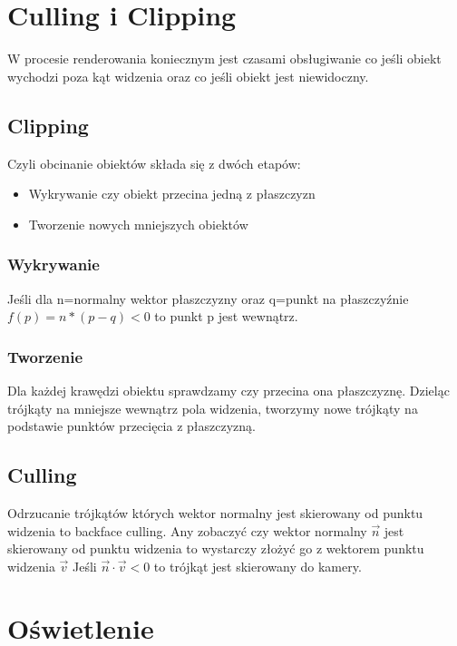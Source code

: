\documentclass{../notatki}
\begin{document}
\section{Culling i Clipping}

W procesie renderowania koniecznym jest czasami obsługiwanie co jeśli obiekt wychodzi poza kąt widzenia oraz co jeśli obiekt jest niewidoczny.

\subsection{Clipping}

Czyli obcinanie obiektów składa się z dwóch etapów:

\begin{itemize}
    \item Wykrywanie czy obiekt przecina jedną z płaszczyzn
    \item Tworzenie nowych mniejszych obiektów
\end{itemize}

\subsubsection{Wykrywanie}

Jeśli dla n=normalny wektor płaszczyzny oraz q=punkt na płaszczyźnie $f(p) = n * (p - q) < 0$ to punkt p jest wewnątrz.

\subsubsection{Tworzenie}

Dla każdej krawędzi obiektu sprawdzamy czy przecina ona płaszczyznę.
Dzieląc trójkąty na mniejsze wewnątrz pola widzenia, tworzymy nowe trójkąty na podstawie punktów przecięcia z płaszczyzną.

\subsection{Culling}

Odrzucanie trójkątów których wektor normalny jest skierowany od punktu widzenia to backface culling.
Any zobaczyć czy wektor normalny $\vec{n}$ jest skierowany od punktu widzenia to wystarczy złożyć go z wektorem punktu widzenia $\vec{v}$
Jeśli $\vec{n} \cdot \vec{v} < 0$ to trójkąt jest skierowany do kamery.

\section{Oświetlenie}
\end{document}
